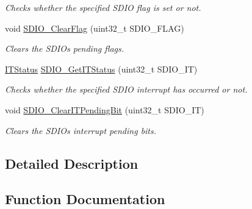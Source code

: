 \begin{DoxyCompactItemize}
\begin{DoxyCompactList}\small\item\em Checks whether the specified S\+D\+IO flag is set or not. \end{DoxyCompactList}\item 
void \hyperlink{group___s_d_i_o___private___functions_ga7aff4efdeb528229135f9f285e53518a}{S\+D\+I\+O\+\_\+\+Clear\+Flag} (uint32\+\_\+t S\+D\+I\+O\+\_\+\+F\+L\+AG)
\begin{DoxyCompactList}\small\item\em Clears the S\+D\+IO\textquotesingle{}s pending flags. \end{DoxyCompactList}\item 
\hyperlink{group___exported__types_gaacbd7ed539db0aacd973a0f6eca34074}{I\+T\+Status} \hyperlink{group___s_d_i_o___private___functions_ga2d64af1f3df0f99cb518f9a89bbd02ac}{S\+D\+I\+O\+\_\+\+Get\+I\+T\+Status} (uint32\+\_\+t S\+D\+I\+O\+\_\+\+IT)
\begin{DoxyCompactList}\small\item\em Checks whether the specified S\+D\+IO interrupt has occurred or not. \end{DoxyCompactList}\item 
void \hyperlink{group___s_d_i_o___private___functions_ga048e07fd86321cd01b2a22c071c3149b}{S\+D\+I\+O\+\_\+\+Clear\+I\+T\+Pending\+Bit} (uint32\+\_\+t S\+D\+I\+O\+\_\+\+IT)
\begin{DoxyCompactList}\small\item\em Clears the S\+D\+IO\textquotesingle{}s interrupt pending bits. \end{DoxyCompactList}\end{DoxyCompactItemize}


\subsection{Detailed Description}


\subsection{Function Documentation}
\mbox{\label{group___s_d_i_o___private___functions_gab44b8cbc21be000a291563076159503b}} 
